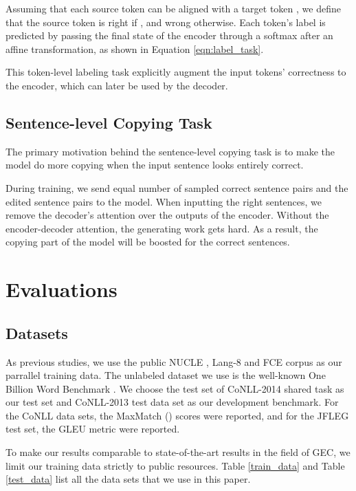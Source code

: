 \documentclass[11pt,a4paper]{article}
\begin{document}
Assuming that each source token  can be aligned with a target token , we define that the source token is right if , and wrong otherwise. Each token's label is predicted by passing the final state  of the encoder through a softmax after an affine transformation, as shown in Equation \ref{eqn:label_task}.



This token-level labeling task explicitly augment the input tokens' correctness to the encoder, which can later be used by the decoder.


\subsection{Sentence-level Copying Task}

The primary motivation behind the sentence-level copying task is to make the model do more copying when the input sentence looks entirely correct. 

During training, we send equal number of sampled correct sentence pairs and the edited sentence pairs to the model. When inputting the right sentences, we remove the decoder's attention over the outputs of the encoder. Without the encoder-decoder attention, the generating work gets hard. As a result, the copying part of the model will be boosted for the correct sentences. 


\section{Evaluations}

\subsection{Datasets}
As previous studies, we use the public NUCLE \cite{dahlmeier2013building}, Lang-8 \cite{tajiri2012tense} and FCE \cite{yannakoudakis2011new} corpus as our parrallel training data. 
The unlabeled dataset we use is the well-known One Billion Word Benchmark \cite{chelba2013one}.
We choose the test set of CoNLL-2014 shared task as our test set and CoNLL-2013 test data set \cite{dahlmeier2013building} as our development benchmark. For the CoNLL data sets, the MaxMatch () scores \cite{dahlmeier2012better} were reported, and for the JFLEG \cite{napoles2017jfleg} test set, the GLEU metric \cite{sakaguchi2016reassessing} were reported.

To make our results comparable to state-of-the-art results in the field of GEC, we limit our training data strictly to public resources. Table \ref{train_data} and Table \ref{test_data} list all the data sets that we use in this paper.
\end{document}
